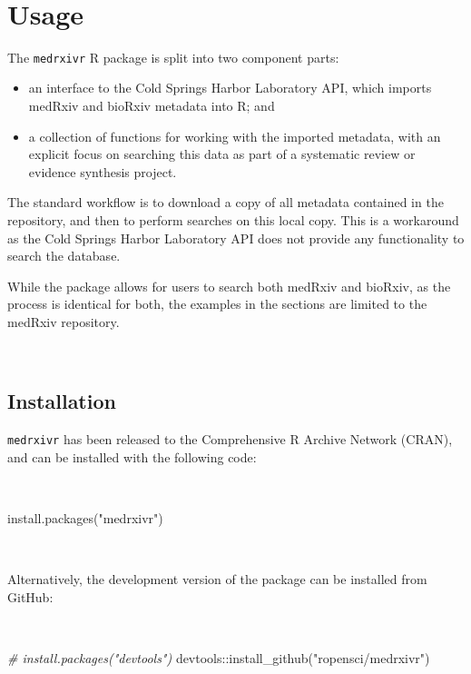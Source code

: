 \documentclass[a4paper, twoside]{templates/ociamthesis}
\providecommand{\tightlist}{%
  \setlength{\itemsep}{0pt}\setlength{\parskip}{0pt}}
\newenvironment{Shaded}{\begin{snugshade}}{\end{snugshade}}
\newcommand{\CommentTok}[1]{\textcolor[rgb]{0.56,0.35,0.01}{\textit{#1}}}
\newcommand{\FunctionTok}[1]{\textcolor[rgb]{0.00,0.00,0.00}{#1}}
\newcommand{\NormalTok}[1]{#1}
\newcommand{\SpecialCharTok}[1]{\textcolor[rgb]{0.00,0.00,0.00}{#1}}
\newcommand{\StringTok}[1]{\textcolor[rgb]{0.31,0.60,0.02}{#1}}
\renewenvironment{Shaded}
{
  \vspace{4pt}%
  \begin{snugshade}%
}{%
  \end{snugshade}%
  \vspace{4pt}%
}
\begin{document}
~

\hypertarget{usage}{%
\section{Usage}\label{usage}}

The \texttt{medrxivr} R package is split into two component parts:

\begin{itemize}
\tightlist
\item
  an interface to the Cold Springs Harbor Laboratory API, which imports medRxiv and bioRxiv metadata into R; and
\item
  a collection of functions for working with the imported metadata, with an explicit focus on searching this data as part of a systematic review or evidence synthesis project.
\end{itemize}

The standard workflow is to download a copy of all metadata contained in the repository, and then to perform searches on this local copy. This is a workaround as the Cold Springs Harbor Laboratory API does not provide any functionality to search the database.

While the package allows for users to search both medRxiv and bioRxiv, as the process is identical for both, the examples in the sections are limited to the medRxiv repository.

~

\hypertarget{installation}{%
\subsection{Installation}\label{installation}}

\texttt{medrxivr} has been released to the Comprehensive R Archive Network (CRAN), and can be installed with the following code:

~

\begin{Shaded}
\begin{Highlighting}[]
\FunctionTok{install.packages}\NormalTok{(}\StringTok{"medrxivr"}\NormalTok{)}
\end{Highlighting}
\end{Shaded}

~

Alternatively, the development version of the package can be installed from GitHub:

~

\begin{Shaded}
\begin{Highlighting}[]
\CommentTok{\# install.packages("devtools") }
\NormalTok{devtools}\SpecialCharTok{::}\FunctionTok{install\_github}\NormalTok{(}\StringTok{"ropensci/medrxivr"}\NormalTok{)}
\end{Highlighting}
\end{Shaded}
\end{document}
